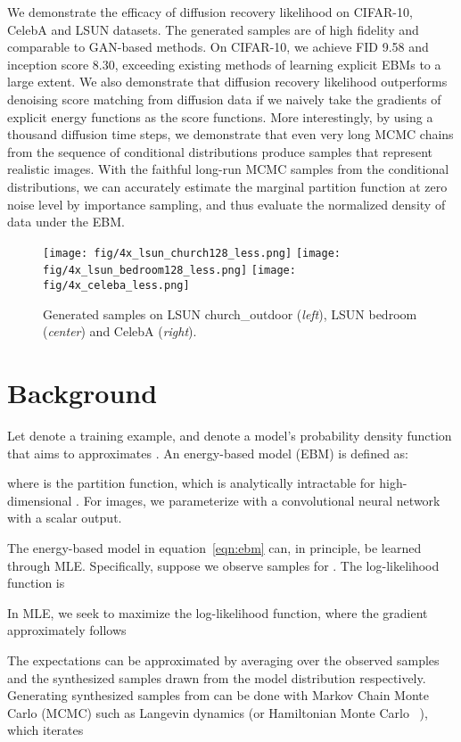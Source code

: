 \documentclass{article} \usepackage{iclr2021_conference,times}
\def\eqref#1{equation~\ref{#1}}
\begin{document}
We demonstrate the efficacy of diffusion recovery likelihood on CIFAR-10, CelebA and LSUN datasets. The generated samples are of high fidelity and comparable to GAN-based methods. On CIFAR-10, we achieve FID 9.58 and inception score 8.30, exceeding existing methods of learning explicit EBMs to a large extent. We also demonstrate that diffusion recovery likelihood outperforms denoising score matching from diffusion data if we naively take the gradients of explicit energy functions as the score functions.  More interestingly, by using a thousand diffusion time steps, we demonstrate that even very long MCMC chains from the sequence of conditional distributions produce samples that represent realistic images. With the faithful long-run MCMC samples from the conditional distributions, we can accurately estimate the marginal partition function at zero noise level by importance sampling, and thus evaluate the normalized density of data under the EBM. 


\begin{figure}[t]
\begin{center}
\texttt{[image: fig/4x\_lsun\_church128\_less.png]} 
\texttt{[image: fig/4x\_lsun\_bedroom128\_less.png]}
\texttt{[image: fig/4x\_celeba\_less.png]} 
\end{center}
\caption{Generated samples on LSUN  church\_outdoor ({\em left}), LSUN  bedroom ({\em center}) and CelebA  ({\em right}).} \label{fig:img1}
\end{figure}

\section{Background}
Let  denote a training example, and  denote a model's probability density function that aims to approximates . An energy-based model (EBM) is defined as:

where  is the partition function, which is analytically intractable for high-dimensional . For images, we parameterize  with a convolutional neural network with a scalar output. 


The energy-based model in \eqref{eqn:ebm} can, in principle, be learned through MLE. Specifically, suppose we observe samples  for . The log-likelihood function is 
  

In MLE, we seek to maximize the log-likelihood function, where the gradient approximately follows~\citep{xie2016theory}

The expectations can be approximated by averaging over the observed samples and the synthesized samples drawn from the model distribution  respectively. Generating synthesized samples from  can be done with Markov Chain Monte Carlo (MCMC) such as Langevin dynamics (or Hamiltonian Monte Carlo ~\citep{girolami2011riemann}), which iterates
\end{document}
